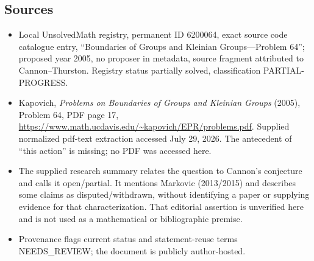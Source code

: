 \documentclass[11pt]{article}
\begin{document}
\subsection{Sources}
\begin{itemize}
\item Local UnsolvedMath registry, permanent ID 6200064, exact source code catalogue entry, ``Boundaries of Groups and Kleinian Groups---Problem 64''; proposed year 2005, no proposer in metadata, source fragment attributed to Cannon--Thurston. Registry status partially solved, classification PARTIAL-PROGRESS.
\item Kapovich, \emph{Problems on Boundaries of Groups and Kleinian Groups} (2005), Problem 64, PDF page 17, \url{https://www.math.ucdavis.edu/~kapovich/EPR/problems.pdf}. Supplied normalized pdf-text extraction accessed July 29, 2026. The antecedent of ``this action'' is missing; no PDF was accessed here.
\item The supplied research summary relates the question to Cannon's conjecture and calls it open/partial. It mentions Markovic (2013/2015) and describes some claims as disputed/withdrawn, without identifying a paper or supplying evidence for that characterization. That editorial assertion is unverified here and is not used as a mathematical or bibliographic premise.
\item Provenance flags current status and statement-reuse terms NEEDS\_REVIEW; the document is publicly author-hosted.
\end{itemize}
\end{document}
